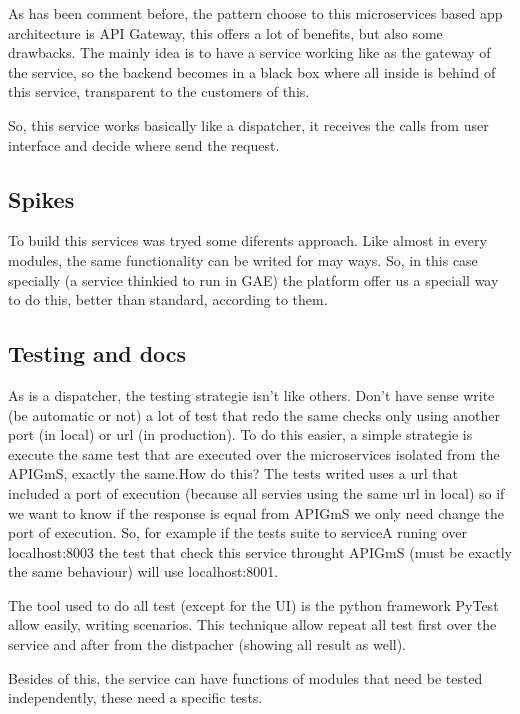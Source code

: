 \documentclass[oneside,english,titlepage]{scrbook}
\begin{document}
As has been comment before, the pattern choose to this microservices
based app architecture is API Gateway, this offers a lot of benefits,
but also some drawbacks. The mainly idea is to have a service working
like as the gateway of the service, so the backend becomes in a black
box where all inside is behind of this service, transparent to the
customers of this.

So, this service works basically like a dispatcher, it receives the
calls from user interface and decide where send the request.

\subsection{Spikes}

To build this services was tryed some diferents approach. Like almost
in every modules, the same functionality can be writed for may ways.
So, in this case specially (a service thinkied to run in GAE) the
platform offer us a speciall way to do this, better than standard,
according to them.

\subsection{Testing and docs}

As is a dispatcher, the testing strategie isn't like others. Don't
have sense write (be automatic or not) a lot of test that redo the
same checks only using another port (in local) or url (in production).
To do this easier, a simple strategie is execute the same test that
are executed over the microservices isolated from the APIGmS, exactly
the same.\bigskip How do this? The tests writed uses a url that included
a port of execution (because all servies using the same url in local)
so if we want to know if the response is equal from APIGmS we only
need change the port of execution. So, for example if the tests suite
to serviceA runing over localhost:8003 the test that check this service
throught APIGmS (must be exactly the same behaviour) will use localhost:8001.

The tool used to do all test (except for the UI) is the python framework
PyTest allow easily, writing scenarios. This technique allow repeat
all test first over the service and after from the distpacher (showing
all result as well).

Besides of this, the service can have functions of modules that need
be tested independently, these need a specific tests.
\end{document}
